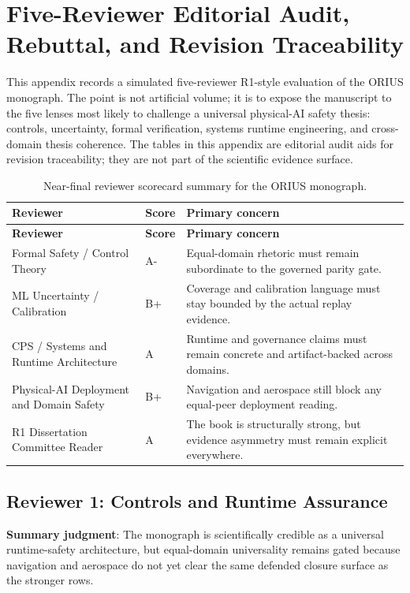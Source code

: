 \chapter{Five-Reviewer Editorial Audit, Rebuttal, and Revision Traceability}
\label{app:reviewer-gap-analysis}

This appendix records a simulated five-reviewer R1-style evaluation of the ORIUS monograph. The point is not artificial volume; it is to expose the manuscript to the five lenses most likely to challenge a universal physical-AI safety thesis: controls, uncertainty, formal verification, systems runtime engineering, and cross-domain thesis coherence. The tables in this appendix are editorial audit aids for revision traceability; they are not part of the scientific evidence surface.

\begin{longtable}{p{}p{}p{}}
\caption{Near-final reviewer scorecard summary for the ORIUS monograph.}\label{tab:reviewer-scorecards}\\
\toprule
\textbf{Reviewer} & \textbf{Score} & \textbf{Primary concern}\\
\midrule
\endfirsthead
\toprule
\textbf{Reviewer} & \textbf{Score} & \textbf{Primary concern}\\
\midrule
\endhead
Formal Safety / Control Theory & A- & Equal-domain rhetoric must remain subordinate to the governed parity gate.\\
ML Uncertainty / Calibration & B+ & Coverage and calibration language must stay bounded by the actual replay evidence.\\
CPS / Systems and Runtime Architecture & A & Runtime and governance claims must remain concrete and artifact-backed across domains.\\
Physical-AI Deployment and Domain Safety & B+ & Navigation and aerospace still block any equal-peer deployment reading.\\
R1 Dissertation Committee Reader & A & The book is structurally strong, but evidence asymmetry must remain explicit everywhere.\\
\bottomrule
\end{longtable}

\section{Reviewer 1: Controls and Runtime Assurance}
\textbf{Summary judgment}: The monograph is scientifically credible as a universal runtime-safety architecture, but equal-domain universality remains gated because navigation and aerospace do not yet clear the same defended closure surface as the stronger rows.

